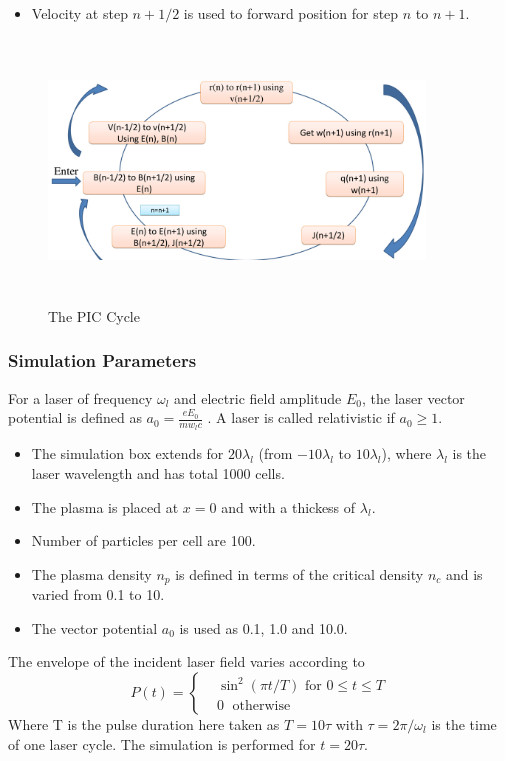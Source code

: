 \documentclass{beamer}
\begin{document}
\begin{frame}
    \small
    \begin{itemize}
        \item Velocity at step $n+1/2$ is used to forward position for step $n$ to $n+1$.
    \end{itemize}
    \begin{figure}
        \includegraphics[width=10cm, height=7cm]{PIC.png}
        \centering
        \caption{The PIC Cycle}
    \end{figure}
\end{frame}
\begin{frame}
    \small
    \frametitle{Simulation Parameters}
    For a laser of frequency $\omega_l$ and electric field amplitude $E_0$, the laser vector potential is defined as
    $
        a_0 = \frac{eE_0}{m w_l c}
    $
    . A laser is called relativistic if $a_0 \ge 1$.
    \begin{itemize}
        \item The simulation box extends for $20 \lambda _l$ (from $-10 \lambda _l$ to $10 \lambda _l$), where $\lambda_l$ is the laser wavelength and has total 1000 cells.
        \item  The plasma is placed at $x=0$ and with a thickess of $\lambda_l$.
        \item  Number of particles per cell are 100.
        \item The plasma density $n_p$ is defined in terms of the critical density $n_c$ and is varied from 0.1 to 10. 
        \item The vector potential $a_0$ is used as 0.1, 1.0 and 10.0.
    \end{itemize}
    The envelope of the incident laser field varies according to
\begin{equation}
    P(t)=
    \begin{cases}
         & \sin^2(\pi t/T) \text{ for } 0 \leq t \le T \\
         & 0         \;      \text{ otherwise }
    \end{cases}
\end{equation}
Where T is the pulse duration here taken as $T=10\tau$ with $\tau = 2\pi/\omega_l$ is the time of one laser cycle. The simulation is performed for $t=20\tau$.
\end{frame}
\end{document}
